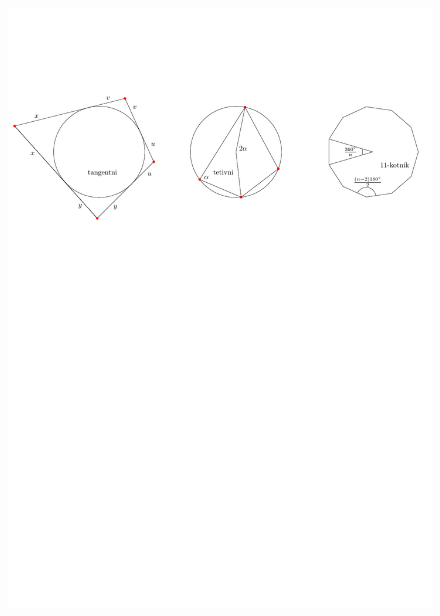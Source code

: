 \documentclass{article}
\begin{document}
\begin{figure}[H]
    \includegraphics[width=1\textwidth]{liki_2.pdf}
    \centering
\end{figure}
\end{document}
